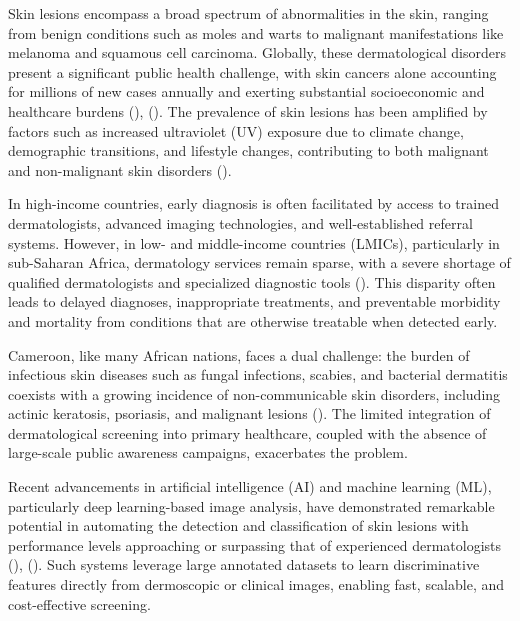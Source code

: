 \documentclass[
  12pt,
  oneside]{article}
\begin{document}
Skin lesions encompass a broad spectrum of abnormalities in the skin,
ranging from benign conditions such as moles and warts to malignant
manifestations like melanoma and squamous cell carcinoma. Globally,
these dermatological disorders present a significant public health
challenge, with skin cancers alone accounting for millions of new cases
annually and exerting substantial socioeconomic and healthcare burdens
(),
(). The prevalence
of skin lesions has been amplified by factors such as increased
ultraviolet (UV) exposure due to climate change, demographic
transitions, and lifestyle changes, contributing to both malignant and
non-malignant skin disorders ().

In high-income countries, early diagnosis is often facilitated by access
to trained dermatologists, advanced imaging technologies, and
well-established referral systems. However, in low- and middle-income
countries (LMICs), particularly in sub-Saharan Africa, dermatology
services remain sparse, with a severe shortage of qualified
dermatologists and specialized diagnostic tools
(). This disparity often
leads to delayed diagnoses, inappropriate treatments, and preventable
morbidity and mortality from conditions that are otherwise treatable
when detected early.

Cameroon, like many African nations, faces a dual challenge: the burden
of infectious skin diseases such as fungal infections, scabies, and
bacterial dermatitis coexists with a growing incidence of
non-communicable skin disorders, including actinic keratosis, psoriasis,
and malignant lesions (). The limited integration of dermatological screening into primary
healthcare, coupled with the absence of large-scale public awareness
campaigns, exacerbates the problem.

Recent advancements in artificial intelligence (AI) and machine learning
(ML), particularly deep learning-based image analysis, have demonstrated
remarkable potential in automating the detection and classification of
skin lesions with performance levels approaching or surpassing that of
experienced dermatologists (), (). Such
systems leverage large annotated datasets to learn discriminative
features directly from dermoscopic or clinical images, enabling fast,
scalable, and cost-effective screening.
\end{document}
